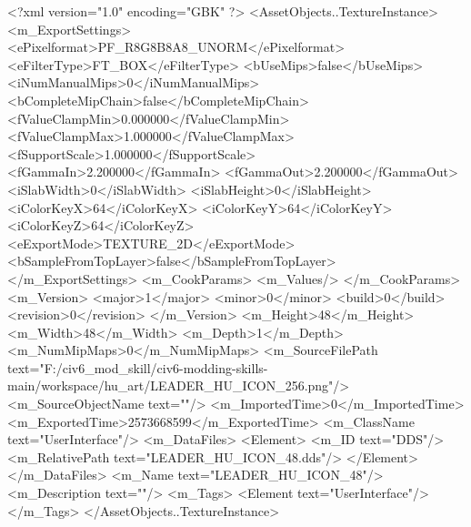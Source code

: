 <?xml version="1.0" encoding="GBK" ?>
<AssetObjects..TextureInstance>
	<m_ExportSettings>
		<ePixelformat>PF_R8G8B8A8_UNORM</ePixelformat>
		<eFilterType>FT_BOX</eFilterType>
		<bUseMips>false</bUseMips>
		<iNumManualMips>0</iNumManualMips>
		<bCompleteMipChain>false</bCompleteMipChain>
		<fValueClampMin>0.000000</fValueClampMin>
		<fValueClampMax>1.000000</fValueClampMax>
		<fSupportScale>1.000000</fSupportScale>
		<fGammaIn>2.200000</fGammaIn>
		<fGammaOut>2.200000</fGammaOut>
		<iSlabWidth>0</iSlabWidth>
		<iSlabHeight>0</iSlabHeight>
		<iColorKeyX>64</iColorKeyX>
		<iColorKeyY>64</iColorKeyY>
		<iColorKeyZ>64</iColorKeyZ>
		<eExportMode>TEXTURE_2D</eExportMode>
		<bSampleFromTopLayer>false</bSampleFromTopLayer>
	</m_ExportSettings>
	<m_CookParams>
		<m_Values/>
	</m_CookParams>
	<m_Version>
		<major>1</major>
		<minor>0</minor>
		<build>0</build>
		<revision>0</revision>
	</m_Version>
	<m_Height>48</m_Height>
	<m_Width>48</m_Width>
	<m_Depth>1</m_Depth>
	<m_NumMipMaps>0</m_NumMipMaps>
	<m_SourceFilePath text="F:/civ6_mod_skill/civ6-modding-skills-main/workspace/hu_art/LEADER_HU_ICON_256.png"/>
	<m_SourceObjectName text=""/>
	<m_ImportedTime>0</m_ImportedTime>
	<m_ExportedTime>2573668599</m_ExportedTime>
	<m_ClassName text="UserInterface"/>
	<m_DataFiles>
		<Element>
			<m_ID text="DDS"/>
			<m_RelativePath text="LEADER_HU_ICON_48.dds"/>
		</Element>
	</m_DataFiles>
	<m_Name text="LEADER_HU_ICON_48"/>
	<m_Description text=""/>
	<m_Tags>
		<Element text="UserInterface"/>
	</m_Tags>
</AssetObjects..TextureInstance>
